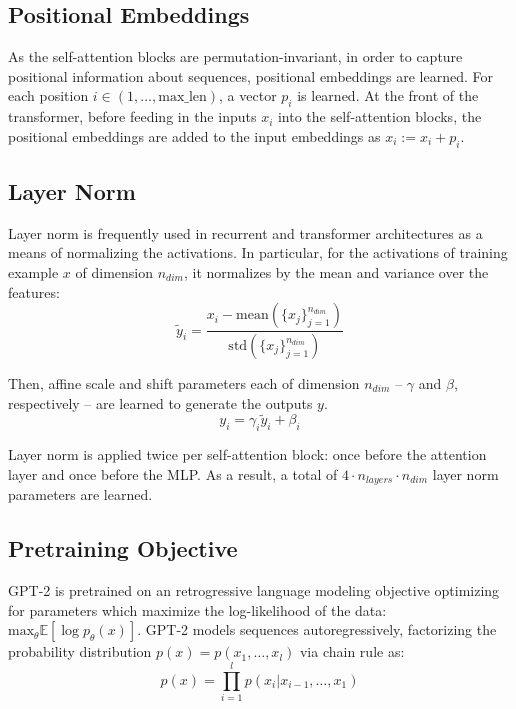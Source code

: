 \subsection{Positional Embeddings}

As the self-attention blocks are permutation-invariant, in order to capture positional information about sequences, positional embeddings are learned.
For each position $i \in (1, \dots, \text{max\_len})$, a vector $p_i$ is learned.
At the front of the transformer, before feeding in the inputs $x_i$ into the self-attention blocks, the positional embeddings are added to the input embeddings as $x_i := x_i + p_i$.

\subsection{Layer Norm}

Layer norm \citep{ba2016layernorm} is frequently used in recurrent and transformer architectures as a means of normalizing the activations.
In particular, for the activations of training example $x$ of dimension $n_{dim}$, it normalizes by the mean and variance over the features:
\begin{equation}
    \tilde{y}_i = \frac{x_i - \text{mean}(\{x_j\}_{j=1}^{n_{dim}})}{\text{std}(\{x_j\}_{j=1}^{n_{dim}})}
\end{equation}

Then, affine scale and shift parameters each of dimension $n_{dim}$ -- $\gamma$ and $\beta$, respectively -- are learned to generate the outputs $y$.
\begin{equation}
    y_i = \gamma_i \tilde{y}_i + \beta_i
\end{equation}

Layer norm is applied twice per self-attention block: once before the attention layer and once before the MLP.
As a result, a total of $4 \cdot n_{layers} \cdot n_{dim}$ layer norm parameters are learned.

\subsection{Pretraining Objective}
\label{app:objective}

GPT-2 is pretrained on an retrogressive language modeling objective optimizing for parameters which maximize the log-likelihood of the data: $\text{max}_\theta \mathbb{E}[\log p_\theta(x)]$.
GPT-2 models sequences autoregressively, factorizing the probability distribution $p(x) = p(x_1, \dots, x_l)$ via chain rule as:
\begin{equation}
    p(x) = \prod_{i=1}^l p(x_i | x_{i-1}, \dots, x_1)
\end{equation}

